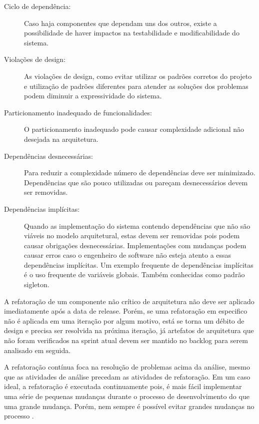 \begin{description}
\item[Ciclo de dependência:]
Caso haja componentes que dependam uns dos outros, existe a possibilidade de haver impactos na testabilidade e modificabilidade do sistema.

\item[Violações de design:]
As violações de design, como evitar utilizar os padrões corretos do projeto e utilização de padrões diferentes para atender as soluções dos problemas podem diminuir a expressividade do sistema.

\item[Particionamento inadequado de funcionalidades:]
O particionamento inadequado pode causar complexidade adicional não desejada na arquitetura.

\item[Dependências desnecessárias:]
Para reduzir a complexidade número de dependências deve ser minimizado. Dependências que são pouco utilizadas ou pareçam desnecessários devem ser removidas.

\item[Dependências implícitas:]
Quando as implementação do sistema contendo dependências que não são viáveis no modelo arquitetural, estas devem ser removidas pois podem causar obrigações desnecessárias. Implementações com mudanças podem causar erros caso o engenheiro de software não esteja atento a essas dependências implícitas. Um exemplo frequente de dependências implícitas é o uso frequente de variáveis globais. Também conhecidas como padrão sigleton.

\end{description}

A refatoração de um componente não crítico de arquitetura não deve ser aplicado imediatamente após a data de release. Porém, se uma refatoração em especifico não é aplicada em uma iteração por algum motivo, está se torna um débito de design e precisa ser resolvida na próxima iteração, já artefatos de arquitetura que não foram verificados na sprint atual devem ser mantido no backlog para serem analisado em seguida.

A refatoração contínua \cite{beck2000extreme} foca na resolução de problemas acima da análise, mesmo que as atividades de análise precedam as atividades de refatoração. Em um caso ideal, a refatoração é executada continuamente \cite{stamelos2007agile} pois, é mais fácil implementar uma série de pequenas mudanças durante o processo de desenvolvimento do que uma grande mudança. Porém, nem sempre é possível evitar grandes mudanças no processo \cite{lippert2006refactoring}. 


